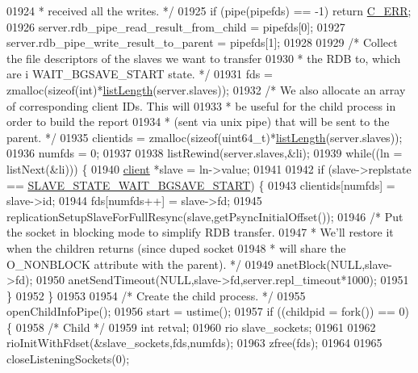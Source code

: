 \begin{DoxyCode}
{{{{{{{{{{{{{{{{{{{{{{{{{{{{{{{{{{{{{{01924 \textcolor{comment}{     * received all the writes. */}
01925     \textcolor{keywordflow}{if} (pipe(pipefds) == -1) \textcolor{keywordflow}{return} \hyperlink{server_8h_af98ac28d5f4d23d7ed5985188e6fb7d1}{C\_ERR};
01926     server.rdb\_pipe\_read\_result\_from\_child = pipefds[0];
01927     server.rdb\_pipe\_write\_result\_to\_parent = pipefds[1];
01928 
01929     \textcolor{comment}{/* Collect the file descriptors of the slaves we want to transfer}
01930 \textcolor{comment}{     * the RDB to, which are i WAIT\_BGSAVE\_START state. */}
01931     fds = zmalloc(\textcolor{keyword}{sizeof}(\textcolor{keywordtype}{int})*\hyperlink{adlist_8h_afde0ab079f934670e82119b43120e94b}{listLength}(server.slaves));
01932     \textcolor{comment}{/* We also allocate an array of corresponding client IDs. This will}
01933 \textcolor{comment}{     * be useful for the child process in order to build the report}
01934 \textcolor{comment}{     * (sent via unix pipe) that will be sent to the parent. */}
01935     clientids = zmalloc(\textcolor{keyword}{sizeof}(uint64\_t)*\hyperlink{adlist_8h_afde0ab079f934670e82119b43120e94b}{listLength}(server.slaves));
01936     numfds = 0;
01937 
01938     listRewind(server.slaves,&li);
01939     \textcolor{keywordflow}{while}((ln = listNext(&li))) \{
01940         \hyperlink{structclient}{client} *slave = ln->value;
01941 
01942         \textcolor{keywordflow}{if} (slave->replstate == \hyperlink{server_8h_a170ee2dd8cfefaf0d112edcc3152f8d7}{SLAVE\_STATE\_WAIT\_BGSAVE\_START}) \{
01943             clientids[numfds] = slave->id;
01944             fds[numfds++] = slave->fd;
01945             replicationSetupSlaveForFullResync(slave,getPsyncInitialOffset());
01946             \textcolor{comment}{/* Put the socket in blocking mode to simplify RDB transfer.}
01947 \textcolor{comment}{             * We'll restore it when the children returns (since duped socket}
01948 \textcolor{comment}{             * will share the O\_NONBLOCK attribute with the parent). */}
01949             anetBlock(NULL,slave->fd);
01950             anetSendTimeout(NULL,slave->fd,server.repl\_timeout*1000);
01951         \}
01952     \}
01953 
01954     \textcolor{comment}{/* Create the child process. */}
01955     openChildInfoPipe();
01956     start = ustime();
01957     \textcolor{keywordflow}{if} ((childpid = fork()) == 0) \{
01958         \textcolor{comment}{/* Child */}
01959         \textcolor{keywordtype}{int} retval;
01960         rio slave\_sockets;
01961 
01962         rioInitWithFdset(&slave\_sockets,fds,numfds);
01963         zfree(fds);
01964 
01965         closeListeningSockets(0);
}}}}}}}}}}}}}}}}}}}}}}}}}}}}}}}}}}}}}}
\end{DoxyCode}
